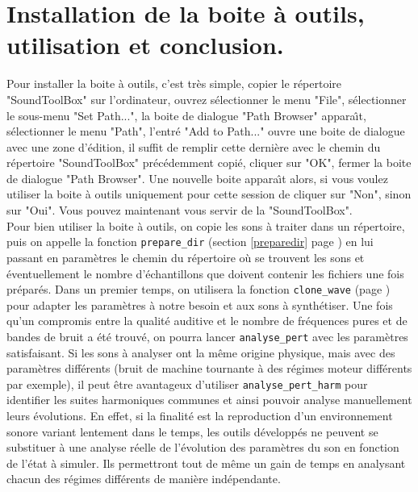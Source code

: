 

\newpage
\section{Installation de la boite {\`a} outils, utilisation et conclusion.}
\label{secutilisation}

Pour installer la boite {\`a} outils, c'est tr{\`e}s simple, copier le
r{\'e}pertoire "SoundToolBox" sur l'ordinateur, ouvrez \matlabv
s{\'e}lectionner le menu "File", s{\'e}lectionner le sous-menu "Set
Path...", la boite de dialogue "Path Browser" appara{\^\i}t,
s{\'e}lectionner le menu "Path", l'entr{\'e} "Add to Path..." ouvre une
boite de dialogue avec une zone d'{\'e}dition, il suffit de remplir
cette derni{\`e}re avec le chemin du r{\'e}pertoire "SoundToolBox"
pr{\'e}c{\'e}demment copi{\'e}, cliquer sur "OK", fermer la boite de dialogue
"Path Browser". Une nouvelle boite appara{\^\i}t alors, si vous voulez
utiliser la boite {\`a} outils uniquement pour cette session de
\matlabv cliquer sur "Non", sinon sur "Oui". Vous pouvez
maintenant vous servir de la "SoundToolBox".\\

Pour bien utiliser la boite {\`a} outils, on copie les sons {\`a} traiter
dans un r{\'e}pertoire, puis on appelle la fonction {\tt prepare\_dir}
(section \ref{preparedir} page \pageref{preparedir}) en lui
passant en param{\`e}tres le chemin du r{\'e}pertoire o{\`u} se trouvent les
sons et {\'e}ventuellement le nombre d'{\'e}chantillons que doivent
contenir les fichiers une fois pr{\'e}par{\'e}s. Dans un premier temps, on
utilisera la fonction {\tt clone\_wave} (page \pageref{clonewave})
pour adapter les param{\`e}tres {\`a} notre besoin et aux sons {\`a}
synth{\'e}tiser. Une fois qu'un compromis entre la qualit{\'e} auditive et
le nombre de fr{\'e}quences pures et de bandes de bruit a {\'e}t{\'e} trouv{\'e},
on pourra lancer {\tt analyse\_pert} avec les param{\`e}tres
satisfaisant. Si les sons {\`a} analyser ont la m{\^e}me origine physique,
mais avec des param{\`e}tres diff{\'e}rents (bruit de machine tournante {\`a}
des r{\'e}gimes moteur diff{\'e}rents par exemple), il peut {\^e}tre
avantageux d'utiliser {\tt analyse\_pert\_harm} pour identifier
les suites harmoniques communes et ainsi pouvoir analyse
manuellement leurs {\'e}volutions. En effet, si la finalit{\'e} est la
reproduction d'un environnement sonore variant lentement dans le
temps, les outils d{\'e}velopp{\'e}s ne peuvent se substituer {\`a} une
analyse r{\'e}elle de l'{\'e}volution des param{\`e}tres du son en fonction de
l'{\'e}tat {\`a} simuler. Ils permettront tout de m{\^e}me un gain de temps en
analysant chacun des r{\'e}gimes diff{\'e}rents de mani{\`e}re ind{\'e}pendante.\\

